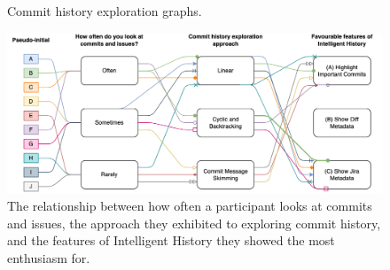 \begin{figure}
  \centering%
  \qquad
  \caption{
    Commit history exploration graphs.
  }%
  \label{fig:Exploration-Graphs}%
\end{figure}

\begin{figure}
  \includegraphics[width=13cm]{./images/flow-chart.png}
  \caption{
    The relationship between how often a participant looks at commits and issues, the approach they exhibited to exploring commit history, and the features of Intelligent History they showed the most enthusiasm for.
  }
  \label{fig:Results-Qualitative}
\end{figure}

